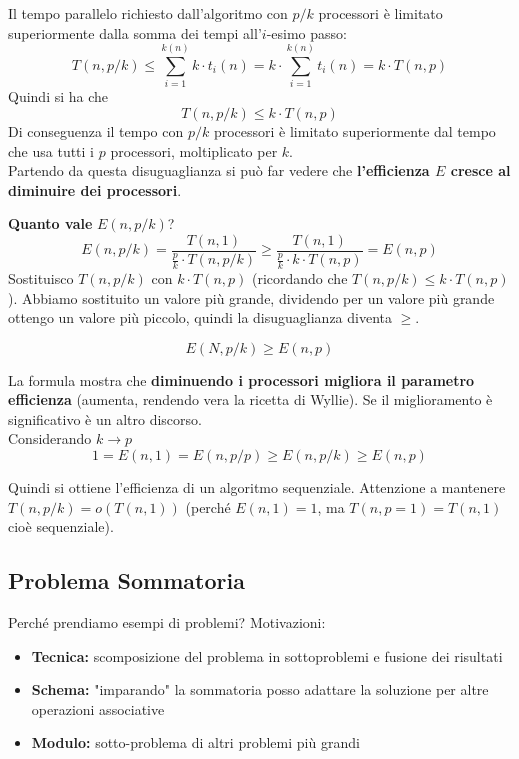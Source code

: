 \documentclass[11pt]{article}
\begin{document}
	Il tempo parallelo richiesto dall'algoritmo con $p/k$ processori è limitato superiormente dalla somma dei tempi all'$i$-esimo passo: 
	$$ T(n, p/k) \leq \sum_{i = 1}^{k(n)} k \cdot t_i (n) = k \cdot \sum_{i = 1}^{k(n)} t_i (n) = k \cdot T(n, p) $$
	Quindi si ha che 
	$$ T(n, p/k) \leq k \cdot T(n, p)$$
	Di conseguenza il tempo con $p/k$ processori è limitato superiormente dal tempo che usa tutti i $p$ processori, moltiplicato per $k$.\\
	
	Partendo da questa disuguaglianza si può far vedere che \textbf{l'efficienza $E$ cresce al diminuire dei processori}.\\
	
	\newpage
	
	\textbf{Quanto vale} $E \left(n, p/k\right)$?
	$$ E \left(n, p/k\right) = \frac{T(n,1)}{\frac{p}{k}  \cdot T(n,p/k)} \geq \frac{T(n,1)}{\frac{p}{k} \cdot k \cdot T(n,p)} = E(n,p) $$
	Sostituisco $T(n, p/k)$ con $k \cdot T(n, p)$ (ricordando che $T(n, p/k) \leq k \cdot T(n, p)$). Abbiamo sostituito un valore più grande, dividendo per un valore più grande ottengo un valore più piccolo, quindi la disuguaglianza diventa $\geq$.
	
	$$ E(N, p/k) \geq E(n,p) $$
	
	La formula mostra che \textbf{diminuendo i processori migliora il parametro efficienza} (aumenta, rendendo vera la ricetta di Wyllie). Se il miglioramento è significativo è un altro discorso.\\
	
	Considerando $k \rightarrow p$
	$$ 1 = E(n,1) = E(n, p/p) \geq E(n, p/k) \geq E(n,p) $$
	
	Quindi si ottiene l'efficienza di un algoritmo sequenziale. Attenzione a mantenere $T(n, p/k) = o(T(n,1))$ (perché $E(n,1) = 1$, ma $T(n, p=1) = T(n,1)$ cioè sequenziale).\\
	
	\newpage
	
	\subsection{Problema Sommatoria}
	Perché prendiamo esempi di problemi? Motivazioni:
	\begin{itemize}
		\item \textbf{Tecnica:} scomposizione del problema in sottoproblemi e fusione dei risultati
		\item \textbf{Schema:} "imparando" la sommatoria posso adattare la soluzione per altre operazioni associative
		\item \textbf{Modulo:} sotto-problema di altri problemi più grandi 
	\end{itemize}
	
\end{document}
